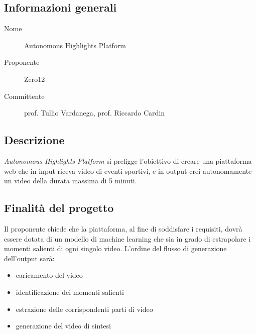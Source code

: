\documentclass[../studio-di-fattibilita.tex]{subfiles}
\begin{document}
	\subsection{Informazioni generali}
	\label{subsec:informazioni_generali}
	\begin{description}
		\item[Nome] Autonomous Highlights Platform
		\item[Proponente] Zero12
		\item[Committente] prof. Tullio Vardanega, prof. Riccardo Cardin
	\end{description}
	\subsection{Descrizione}
	\label{subsec:Descrizione}
	\textit{Autonomous Highlights Platform} si prefigge l'obiettivo di creare una piattaforma web che in input riceva video di eventi sportivi, e in output crei autonomamente un video della durata massima di 5 minuti.
	\subsection{Finalità del progetto}
	\label{subsec:finalità_del_progetto}
	Il proponente chiede che la piattaforma, al fine di soddisfare i requisiti, dovrà essere dotata di un modello di machine learning che sia in grado di estrapolare i momenti salienti di ogni singolo video. L'ordine del flusso di generazione dell'output sarà:
	\begin{itemize}
		\item caricamento del video
		\item identificazione dei momenti salienti
		\item estrazione delle corrispondenti parti di video
		\item generazione del video di sintesi	
	\end{itemize}
\end{document}
